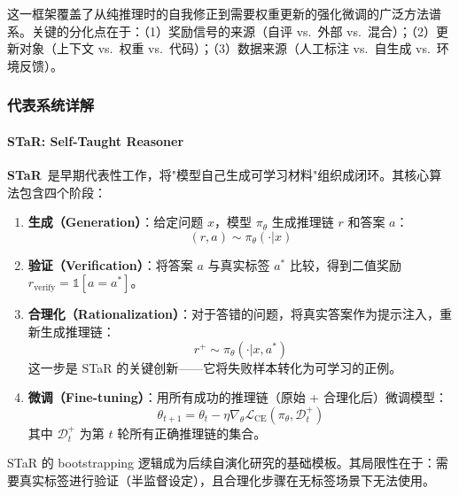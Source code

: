 这一框架覆盖了从纯推理时的自我修正到需要权重更新的强化微调的广泛方法谱系。关键的分化点在于：（1）奖励信号的来源（自评 vs.\ 外部 vs.\ 混合）；（2）更新对象（上下文 vs.\ 权重 vs.\ 代码）；（3）数据来源（人工标注 vs.\ 自生成 vs.\ 环境反馈）。

\subsubsection{代表系统详解}

\paragraph{STaR: Self-Taught Reasoner}

\textbf{STaR}~\citep{star2022}是早期代表性工作，将"模型自己生成可学习材料"组织成闭环。其核心算法包含四个阶段：

\begin{enumerate}
\item \textbf{生成（Generation）}：给定问题 $x$，模型 $\pi_\theta$ 生成推理链 $r$ 和答案 $a$：
\begin{equation}
(r, a) \sim \pi_\theta(\cdot | x)
\label{eq:star-generate}
\end{equation}

\item \textbf{验证（Verification）}：将答案 $a$ 与真实标签 $a^*$ 比较，得到二值奖励 $r_{\mathrm{verify}} = \mathbb{1}[a = a^*]$。

\item \textbf{合理化（Rationalization）}：对于答错的问题，将真实答案作为提示注入，重新生成推理链：
\begin{equation}
r^+ \sim \pi_\theta(\cdot | x, a^*)
\label{eq:star-rationalize}
\end{equation}
这一步是 STaR 的关键创新——它将失败样本转化为可学习的正例。

\item \textbf{微调（Fine-tuning）}：用所有成功的推理链（原始 + 合理化后）微调模型：
\begin{equation}
\theta_{t+1} = \theta_t - \eta \nabla_\theta \mathcal{L}_{\mathrm{CE}}(\pi_\theta, \mathcal{D}_t^+)
\label{eq:star-train}
\end{equation}
其中 $\mathcal{D}_t^+$ 为第 $t$ 轮所有正确推理链的集合。
\end{enumerate}

STaR 的 bootstrapping 逻辑成为后续自演化研究的基础模板。其局限性在于：需要真实标签进行验证（半监督设定），且合理化步骤在无标签场景下无法使用。

